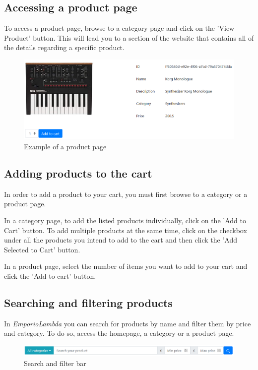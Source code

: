 \subsection{Accessing a product page}
To access a product page, browse to a category page and click on the 'View Product' button. This will lead you to a section of the website that contains all of the details regarding a specific product. 

\begin{figure}[H]
\centering
\includegraphics[scale=0.6]{res/Immagini/ProductPage}
\caption{Example of a product page}
\end{figure}

\subsection{Adding products to the cart}
In order to add a product to your cart, you must first browse to a category or a product page.

In a category page, to add the listed products individually, click on the 'Add to Cart' button. To add multiple products at the same time, click on the checkbox under all the products you intend to add to the cart and then click the 'Add Selected to Cart' button.

In a product page, select the number of items you want to add to your cart and click the 'Add to cart' button.

\subsection{Searching and filtering products}
In \textit{EmporioLambda} you can search for products by name and filter them by price and category. To do so, access the homepage, a category or a product page.

\begin{figure}[H]
\centering
\includegraphics[scale=0.6]{res/Immagini/SearchFilterBar}
\caption{Search and filter bar}
\end{figure}

